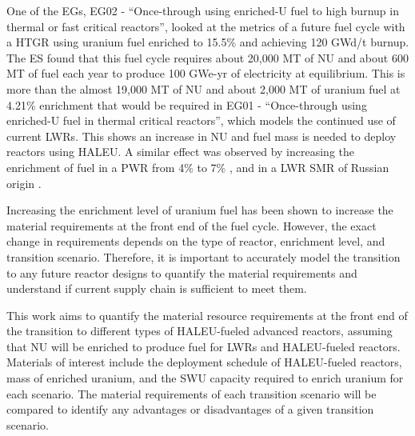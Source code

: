 One of the \glspl{EG}, \gls{EG}02 - ``Once-through using enriched-U fuel to 
high burnup in thermal or fast critical reactors'', looked at the metrics 
of a future fuel cycle with a \gls{HTGR} using uranium fuel enriched to 
15.5\% and achieving 120 GWd/t burnup. The \gls{ES} found that this fuel cycle
requires about 20,000 MT of \gls{NU} and about 600 MT of fuel each year 
to produce 100 GWe-yr of electricity at equilibrium. This is more than the 
almost 19,000 MT of \gls{NU} and about 2,000 MT of uranium fuel at 4.21\%
enrichment that would be required in \gls{EG}01 - ``Once-through using enriched-U 
fuel in thermal critical reactors'', which models the continued use of current 
\glspl{LWR}. This shows an increase in \gls{NU} and fuel mass is needed to 
deploy reactors using \gls{HALEU}.
A similar effect was observed by increasing the enrichment of fuel in a 
\gls{PWR} from 4\% to 7\% \cite{burns_reactor_2020}, and in a \gls{LWR}
\gls{SMR} of Russian origin \cite{hernandez_potential_2020}. 

Increasing the enrichment level of uranium fuel has been shown to 
increase the material requirements at the front end of 
the fuel cycle. However, the exact change in requirements depends 
on the type of reactor, enrichment level, and transition scenario.
Therefore, it is important to accurately model the transition to any future
reactor designs to quantify the material requirements and understand
if current supply chain is sufficient to meet them. 

This work aims to quantify the material resource requirements at the front 
end of the 
transition to different types of \gls{HALEU}-fueled advanced reactors, 
assuming that \gls{NU} will be enriched to produce fuel for \glspl{LWR} and 
\gls{HALEU}-fueled reactors. 
Materials of interest include the deployment schedule of \gls{HALEU}-fueled 
reactors, mass of enriched uranium, and the \gls{SWU} capacity required to 
enrich uranium for each scenario. The material requirements of each transition 
scenario will be compared to identify any advantages or disadvantages of 
a given transition scenario. 